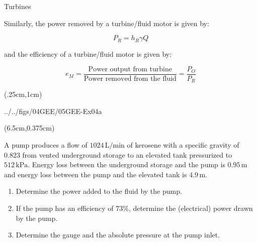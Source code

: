 \documentclass[9pt,xcolor={svgnames, x11names},professionalfonts, mathserif]{beamer}
\begin{document}

\begin{frame}{Turbines}
	\begin{cmini}{
			Similarly, the power removed by a turbine/fluid motor is given by:
			
			\[ P_R = h_R \gamma Q \]
			\par\bigskip
			and the efficiency of a turbine/fluid motor is given by:
			
			\[ e_M =  \frac{\text{Power output from turbine}}{\text{Power removed from the fluid}}=\frac{P_O}{P_R} \]
			}\end{cmini}
		\end{frame}
		
		\begin{frame}
			\begin{textblock*}{0.5\textwidth}(.25cm,1cm)
				\begin{cfig}[0.25]{../../figs/04GEE/05GEE-Ex04a}\end{cfig}
			\end{textblock*}
			\begin{textblock*}{0.55\textwidth}(6.5cm,0.375cm)
				\begin{myexam}[colframe=example, colbacktitle=example!80!white]{}{}
					\raggedright
					A pump produces a flow of $1024\,\text{L/min}$ of kerosene with a specific gravity of $0.823$ from vented underground storage to an elevated tank pressurized to $512\,\text{kPa}$. Energy loss between the underground storage and the pump is $0.95\,\text{m}$ and energy loss between the pump and the elevated tank is $4.9\,\text{m}$.
					\begin{enumerate}
						\item Determine the power added to the fluid by the pump.
						\item If the pump has an efficiency of $73\%$, determine the (electrical) power drawn by the pump.
						\item Determine the gauge and the absolute pressure at the pump inlet.
					\end{enumerate}
				\end{myexam}
			\end{textblock*}
		\end{frame}
		
\end{document}
